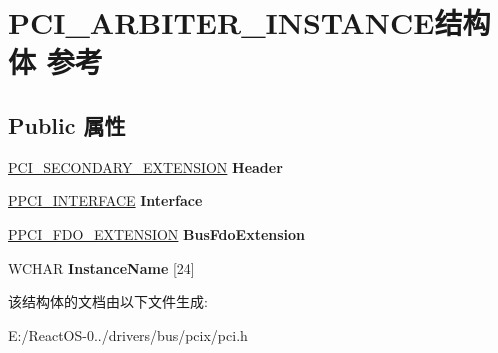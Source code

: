 \hypertarget{struct_p_c_i___a_r_b_i_t_e_r___i_n_s_t_a_n_c_e}{}\section{P\+C\+I\+\_\+\+A\+R\+B\+I\+T\+E\+R\+\_\+\+I\+N\+S\+T\+A\+N\+C\+E结构体 参考}
\label{struct_p_c_i___a_r_b_i_t_e_r___i_n_s_t_a_n_c_e}
\subsection*{Public 属性}
\begin{DoxyCompactItemize}
\item 
\mbox{\label{struct_p_c_i___a_r_b_i_t_e_r___i_n_s_t_a_n_c_e_a8e1f1f5cf679f84d28d590361fffe4d7}} 
\hyperlink{struct_p_c_i___s_e_c_o_n_d_a_r_y___e_x_t_e_n_s_i_o_n}{P\+C\+I\+\_\+\+S\+E\+C\+O\+N\+D\+A\+R\+Y\+\_\+\+E\+X\+T\+E\+N\+S\+I\+ON} {\bfseries Header}
\item 
\mbox{\label{struct_p_c_i___a_r_b_i_t_e_r___i_n_s_t_a_n_c_e_af7ed7401195809f8c7b0ccedcac336d8}} 
\hyperlink{struct___p_c_i___i_n_t_e_r_f_a_c_e}{P\+P\+C\+I\+\_\+\+I\+N\+T\+E\+R\+F\+A\+CE} {\bfseries Interface}
\item 
\mbox{\label{struct_p_c_i___a_r_b_i_t_e_r___i_n_s_t_a_n_c_e_a1f109951e4e779d056338cb939aa0fa5}} 
\hyperlink{struct___p_c_i___f_d_o___e_x_t_e_n_s_i_o_n}{P\+P\+C\+I\+\_\+\+F\+D\+O\+\_\+\+E\+X\+T\+E\+N\+S\+I\+ON} {\bfseries Bus\+Fdo\+Extension}
\item 
\mbox{\label{struct_p_c_i___a_r_b_i_t_e_r___i_n_s_t_a_n_c_e_ab49d097cd8408232c06a0dc82aa149f0}} 
W\+C\+H\+AR {\bfseries Instance\+Name} \mbox{[}24\mbox{]}
\end{DoxyCompactItemize}


该结构体的文档由以下文件生成\+:\begin{DoxyCompactItemize}
\item 
E\+:/\+React\+O\+S-\/0../drivers/bus/pcix/pci.\+h\end{DoxyCompactItemize}
